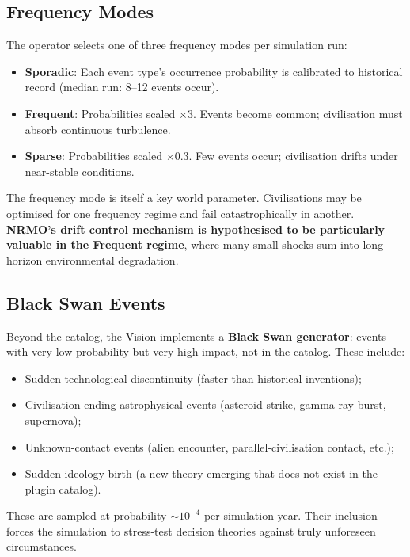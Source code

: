\subsection{Frequency Modes}
\label{sec:vision-frequency}

The operator selects one of three frequency modes per simulation
run:

\begin{itemize}
\item \textbf{Sporadic}: Each event type's occurrence probability is
calibrated to historical record (median run: 8--12 events occur).
\item \textbf{Frequent}: Probabilities scaled $\times 3$. Events become
common; civilisation must absorb continuous turbulence.
\item \textbf{Sparse}: Probabilities scaled $\times 0.3$. Few events
occur; civilisation drifts under near-stable conditions.
\end{itemize}

The frequency mode is itself a key world parameter. Civilisations may
be optimised for one frequency regime and fail catastrophically in
another. \textbf{NRMO's drift control mechanism is hypothesised to be
particularly valuable in the Frequent regime}, where many small shocks
sum into long-horizon environmental degradation.

\subsection{Black Swan Events}
\label{sec:vision-black-swan}

Beyond the catalog, the Vision implements a \textbf{Black Swan
generator}: events with very low probability but very high impact, not
in the catalog. These include:

\begin{itemize}
\item Sudden technological discontinuity (faster-than-historical
inventions);
\item Civilisation-ending astrophysical events (asteroid strike,
gamma-ray burst, supernova);
\item Unknown-contact events (alien encounter, parallel-civilisation
contact, etc.);
\item Sudden ideology birth (a new theory emerging that does not exist
in the plugin catalog).
\end{itemize}

These are sampled at probability $\sim 10^{-4}$ per simulation year.
Their inclusion forces the simulation to stress-test decision theories
against truly unforeseen circumstances.

